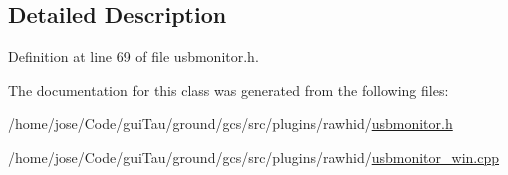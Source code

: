 \subsection{Detailed Description}


Definition at line 69 of file usbmonitor.\-h.



The documentation for this class was generated from the following files\-:\begin{DoxyCompactItemize}
\item 
/home/jose/\-Code/gui\-Tau/ground/gcs/src/plugins/rawhid/\hyperlink{usbmonitor_8h}{usbmonitor.\-h}\item 
/home/jose/\-Code/gui\-Tau/ground/gcs/src/plugins/rawhid/\hyperlink{usbmonitor__win_8cpp}{usbmonitor\-\_\-win.\-cpp}\end{DoxyCompactItemize}
